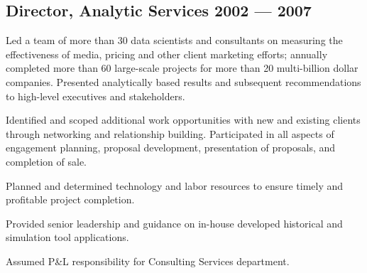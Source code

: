 \subsection{{Director, Analytic Services \hfill 2002 --- 2007}}
\begin{zitemize}

\item Led a team of more than 30 data scientists and consultants on measuring the effectiveness of media, pricing and other client marketing efforts;  annually completed more than 60 large-scale projects for more than 20 multi-billion dollar companies.  Presented analytically based results and subsequent recommendations to high-level executives and stakeholders. 
\vspace{0.2em}
\item Identified and scoped additional work opportunities with new and existing clients through networking and relationship building.  Participated in all aspects of engagement planning, proposal development, presentation of proposals, and completion of sale.
\vspace{0.2em}
\item Planned and determined technology and labor resources to ensure timely and profitable project completion.
\vspace{0.2em}
\item Provided senior leadership and guidance on in-house developed  historical and simulation tool applications.
\item  Assumed P\&L responsibility for Consulting Services department.  
\end{zitemize}


